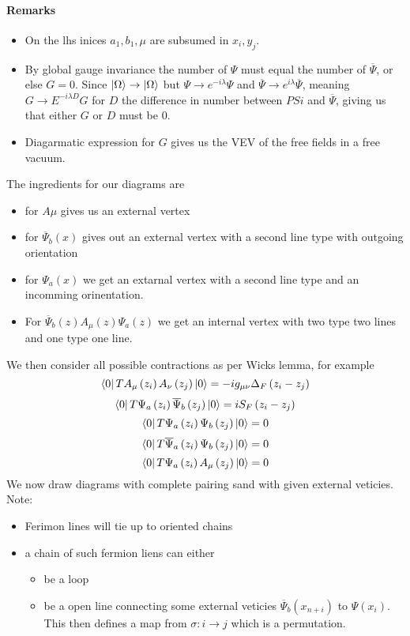 \documentclass{report}
\begin{document}
\paragraph{Remarks}
\begin{itemize}
  \item On the lhs inices $a_1, b_1, \mu$ are subsumed in $x_i, y_j$.
  \item By global gauge invariance the number of $\Psi$ must equal the number of $\overline{\Psi}$, or else $G = 0$. Since $\ket{\Omega} \to \ket{\Omega} $ but $\Psi \to e^{-i\lambda} \Psi$ and $\overline{\Psi} \to  e^{i\lambda} \overline{\Psi}$, meaning $G \to E^{-i\lambda D} G$ for $D$ the difference in number between $PSi$ and $\overline{\Psi}$, giving us that either $G$ or $D$ must be $0$.
  \item Diagarmatic expression for $G$ gives us the VEV of the free fields in a free vacuum.
\end{itemize}
The ingredients for our diagrams are
\begin{itemize}
  \item for $A\mu$ gives us an external vertex
  \item for $\overline{\Psi}_b\left( x \right) $ gives out an external vertex with a second line type with outgoing orientation
  \item for $\Psi_a\left( x \right) $ we get an extarnal vertex with a second line type and an incomming orinentation.
  \item For $\overline{\Psi}_b\left( z \right) A_\mu\left( z \right) \Psi_a\left( z \right) $ we get an internal vertex with two type two lines and one type one line.
\end{itemize}
We then consider all possible contractions as per Wicks lemma, for example \[
\bra{0} T A_\mu\left( z_i \right) A_\nu\left( z_j \right) \ket{0} = - i g_{\mu\nu} \Delta_F\left( z_i - z_j \right) 
\] \[
\bra{0} T \Psi_a\left( z_i \right) \overline{\Psi}_b\left( z_j \right) \ket{0} = i S_F\left( z_i - z_j \right) 
\] \[
\bra{0} T \Psi_a\left( z_i \right)\Psi_b\left( z_j \right) \ket{0} = 0
\] \[
\bra{0} T \overline{\Psi}_a\left( z_i \right)\Psi_b\left( z_j \right) \ket{0} = 0
\] \[
\bra{0} T \Psi_a\left( z_i \right) A_\mu\left( z_j \right) \ket{0} = 0
\]
We now draw diagrams with complete pairing sand with given external veticies. Note:
\begin{itemize}
  \item Ferimon lines will tie up to oriented chains
  \item a chain of such fermion liens can either
    \begin{itemize}
      \item be a loop
      \item be a open line connecting some external veticies $\overline{\Psi}_b\left( x_{n+i}  \right) $ to $\Psi\left( x_i \right) $. This then defines a map from $\sigma : i \to j$ which is a permutation.
    \end{itemize}
\end{itemize}
\end{document}
